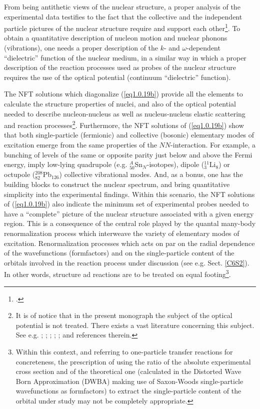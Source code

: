 From being antithetic views of the nuclear structure, a proper analysis of the experimental data testifies to the fact that the collective and the independent particle pictures of the nuclear structure require and support each other\footnote{\cite{Bohr:75}.}. To obtain a quantitative description of nucleon  motion and nuclear phonons (vibrations), one needs a proper description of the $k$- and $\omega$-dependent ``dielectric'' function of the nuclear medium, in a similar way in which a proper description of the reaction processes used as probes of the nuclear structure requires the use of the optical potential (continuum ``dielectric'' function). 


The NFT solutions which diagonalize  (\ref{eq1.0.19b}) provide all the elements to calculate the structure properties of nuclei, and also of the optical potential needed to describe nucleon-nucleus as well as nucleus-nucleus elastic scattering and reaction processes\footnote{\label{f21c1} It is of notice that in the present monograph the subject of the optical potential is not treated.  There exists a vast literature concerning this subject. See e.g. \cite{Feshbach:58,Feshbach:62,Jackson:70,Jeukenne:76,Sartor:80,Pollarolo:83,Satchler:83,Mahaux:85,Broglia:04a,Dickhoff:05,Montanari:14,Dickhoff:17}; \cite{Dickhoff:19};  \cite{Fernandez:10}; \cite{Fernandez:10b}; \cite{Jenning:11};  \cite{Barbieri:05,Rotureau:17,Broglia:81b} and references therein.}.
Furthermore, the NFT solutions of (\ref{eq1.0.19b}) show that both single-particle (fermionic) and collective (bosonic) elementary modes of excitation emerge from the same properties of the $NN$-interaction. For example, a bunching of levels of the same or opposite parity just below and above the Fermi energy, imply low-lying quadrupole (e.g. $^A_{50}$Sn$_{N}$-isotopes), dipole ($^{11}_3$Li$_8$) or octupole ($^{208}_{82}$Pb$_{126}$) collective vibrational modes. And, as a bonus, one has the building blocks to construct the nuclear spectrum, and bring quantitative simplicity into the experimental findings. Within this scenario, the NFT solutions of (\ref{eq1.0.19b}) also indicate the minimum set of experimental probes needed to have a ``complete'' picture of the nuclear structure associated with a given energy region. This is a consequence of the central role played by the quantal many-body renormalization process which interweave the variety of elementary modes of excitation.
Renormalization processes which acts on par on the radial dependence of the wavefunctions (formfactors) and on the single-particle content of the orbitals involved in the reaction process under discussion (see e.g. Sect. \ref{C6S2}). In other words, structure ad reactions are to be treated on equal footing\footnote{Within this context, and referring to one-particle transfer reactions for concreteness, the prescription of using the ratio of the absolute experimental cross section  and of the theoretical one (calculated in the Distorted Wave Born Approximation (DWBA) making use of Saxon-Woods single-particle wavefunctions as formfactors) to extract the single-particle content of the orbital under study may not be completely appropriate.}. 


